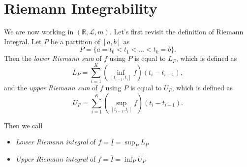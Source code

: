 \section{Riemann Integrability}
We are now working in \((\mathbb{R} , \mathcal{L} , m)\). Let's first revisit the definition of
Riemann Integral. Let \(P\) be a partition of \([a, b]\) as
\[
	P = \{a = t_0 < t_1 < \dots < t_k = b \}.
\]
Then the \emph{lower Riemann sum} of \(f\) using \(P\) is equal to \(L_P\), which is defined as
\[
	L_{P} = \sum_{i=1}^{K} \left(\inf _{[t_{i-1}, t_{i}]} f \right)(t_{i} - t_{i - 1}),
\]
and the \emph{upper Riemann sum} of \(f\) using \(P\) is equal to \(U_P\), which is defined as
\[
	U_{P} = \sum_{i=1}^{K} \left(\sup _{[t_{i-1}, t_{i}]} f \right)(t_{i} - t_{i - 1}).
\]

Then we call
\begin{itemize}
	\item \emph{Lower Riemann integral} of \(f = \underline{I} = \sup_P L_{P} \)
	\item \emph{Upper Riemann integral} of \(f = \overline{I}  = \inf_P U_{P} \)
\end{itemize}

